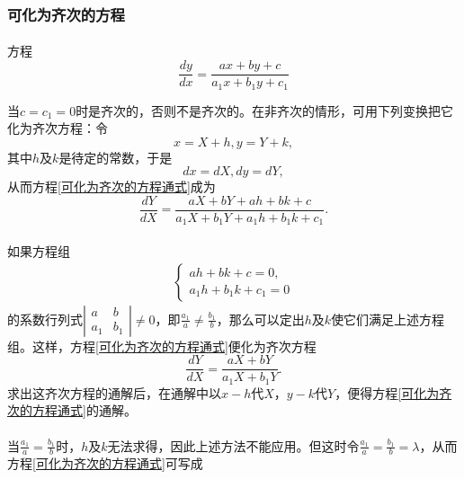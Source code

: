 \subsubsection{可化为齐次的方程}
\paragraph{}
方程
\begin{equation}
  \label{可化为齐次的方程通式}
  \frac{dy}{dx} = \frac{ax+by+c}{a_1x+b_1y+c_1}
\end{equation}

当$c=c_1=0$时是齐次的，否则不是齐次的。在非齐次的情形，可用下列变换把它化为齐次方程：令
\begin{equation*}
  x = X + h, y = Y + k,
\end{equation*}
其中$h$及$k$是待定的常数，于是
\begin{equation*}
  dx = dX, dy = dY,
\end{equation*}
从而方程\eqref{可化为齐次的方程通式}成为
\begin{equation*}
  \frac{dY}{dX} = \frac{aX+bY+ah+bk+c}{a_1X+b_1Y+a_1h+b_1k+c_1}.
\end{equation*}

\paragraph{}
\setlength{\baselineskip}{30pt}
如果方程组
\begin{align*}
  \left\{\begin{array}{l}
    ah + bk + c = 0, \\
    a_1h+b_1k+c_1 = 0
  \end{array} \right.
\end{align*}
的系数行列式$\displaystyle \left|\begin{array}{ll}
  a & b \\ a_1 & b_1
\end{array} \right| \neq 0$，即$\displaystyle \frac{a_1}{a} \neq \frac{b_1}{b}$，那么可以定出$h$及$k$使它们满足上述方程组。这样，方程\eqref{可化为齐次的方程通式}便化为齐次方程
\begin{equation*}
  \frac{dY}{dX} = \frac{aX+bY}{a_1X+b_1Y}.
\end{equation*}
求出这齐次方程的通解后，在通解中以$x-h$代$X$，$y-k$代$Y$，便得方程\eqref{可化为齐次的方程通式}的通解。

\paragraph{}
当$\displaystyle \frac{a_1}{a}=\frac{b_1}{b}$时，$h$及$k$无法求得，因此上述方法不能应用。但这时令$\displaystyle \frac{a_1}{a}=\frac{b_1}{b}=\lambda$，从而方程\eqref{可化为齐次的方程通式}可写成

